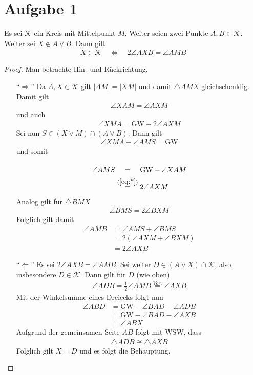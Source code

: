 \documentclass[11pt]{article}
\begin{document}
	\section*{Aufgabe 1}
	Es sei $ \mathcal K $ ein Kreis mit Mittelpunkt $ M $. Weiter seien zwei Punkte $ A,B \in \mathcal K $. Weiter sei $ X \notin A\lor B$. Dann gilt
	\begin{align*}
	X \in \mathcal{K} \quad \Leftrightarrow \quad 2 \angle AXB = \angle AMB
	\end{align*}
	\begin{proof} Man betrachte Hin- und Rückrichtung.
		\begin{itemize}
			\item[\enquote{$ \Rightarrow $}] Da $ A,X \in \mathcal K $ gilt $ \left|AM\right| = \left|XM\right| $ und damit $ \triangle AMX $ gleichschenklig. Damit gilt
			\begin{align*}
			\angle XAM = \angle AXM
			\end{align*}
			und auch
			\begin{align}
			\angle XMA = \mathrm{GW} - 2\angle AXM \label{eq:*}
			\end{align}
			Sei nun $ S \in \left(X \lor M\right) \cap \left(A \lor B\right) $. Dann gilt
			\begin{align*}
			\angle XMA + \angle AMS = \mathrm{GW}
			\end{align*}
			und somit
			\begin{align*}
			\angle AMS &\stackrel{\phantom{(\ref{eq:*})}}{=} \mathrm{GW} - \angle XAM\\
			&\stackrel{(\ref{eq:*})}{=} 2 \angle AXM
			\end{align*}
			Analog gilt für $ \triangle BMX $
			\begin{align*}
			\angle BMS = 2 \angle BXM
			\end{align*}
			Folglich gilt damit
			\begin{align*}
			\angle AMB &= \angle AMS + \angle BMS\\
			&= 2\left(\angle AXM + \angle BXM\right)\\
			&= 2 \angle AXB
			\end{align*}
			\item[\enquote{$ \Leftarrow $}] Es sei $ 2\angle AXB = \angle AMB $. Sei weiter $ D \in \left(A\lor X\right) \cap \mathcal{K} $, also insbesondere $ D \in \mathcal K $. Dann gilt für $ D $ (wie oben)
			\begin{align*}
			\angle ADB = \frac{1}{2} \angle AMB \stackrel{Vor.}{=} \angle AXB
			\end{align*}
			Mit der Winkelsumme eines Dreiecks folgt nun
			\begin{align*}
			\angle ABD &= \mathrm{GW} - \angle BAD - \angle ADB\\
			&= \mathrm{GW} - \angle BAD - \angle AXB\\
			&= \angle ABX
			\end{align*}
			\newpage Aufgrund der gemeinsamen Seite $ AB $ folgt mit WSW, dass
			\begin{align*}
			\triangle ADB \cong \triangle AXB
			\end{align*}
			Folglich gilt $ X = D $ und es folgt die Behauptung.
		\end{itemize}
	\end{proof}
\end{document}

